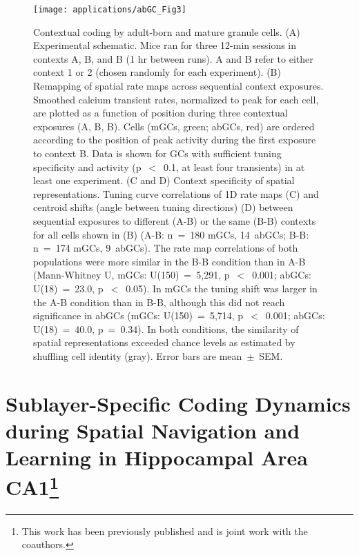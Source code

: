 \begin{figure}
	\centering
	\texttt{[image: applications/abGC\_Fig3]}
	\caption[Contextual coding by adult-born and mature granule cells]{Contextual coding by adult-born and mature granule cells.
	(A) Experimental schematic. Mice ran for three 12-min sessions in contexts A, B, and B (1 hr between runs). A and B refer to either context 1 or 2 (chosen randomly for each experiment).
	(B) Remapping of spatial rate maps across sequential context exposures. Smoothed calcium transient rates, normalized to peak for each cell, are plotted as a function of position during three contextual exposures (A, B, B). Cells (mGCs, green; abGCs, red) are ordered according to the position of peak activity during the first exposure to context B. Data is shown for GCs with sufficient tuning specificity and activity (p~$<$~0.1, at least four transients) in at least one experiment.
	(C and D) Context specificity of spatial representations. Tuning curve correlations of 1D rate maps (C) and centroid shifts (angle between tuning directions) (D) between sequential exposures to different (A-B) or the same (B-B) contexts for all cells shown in (B) (A-B: n~=~180 mGCs, 14~abGCs; B-B: n~=~174 mGCs, 9~abGCs). The rate map correlations of both populations were more similar in the B-B condition than in A-B (Mann-Whitney U, mGCs: U(150)~=~5,291, p~$<$~0.001; abGCs: U(18)~=~23.0, p~$<$~0.05). In mGCs the tuning shift was larger in the A-B condition than in B-B, although this did not reach significance in abGCs (mGCs: U(150)~=~5,714, p~$<$~0.001; abGCs: U(18)~=~40.0, p~=~0.34). In both conditions, the similarity of spatial representations exceeded chance levels as estimated by shuffling cell identity (gray).
	Error bars are mean~$\pm$~SEM.}
	\label{fig:other:dg:context}
\end{figure}

\section[Sublayer-Specific Coding Dynamics during Spatial Navigation and Learning in Hippocampal Area CA1]{Sublayer-Specific Coding Dynamics during Spatial Navigation and Learning in Hippocampal Area CA1\footnote{This work has been previously published \citep{Danielson2016b} and is joint work with the coauthors.}}
\label{sec:other:sf-deep}

